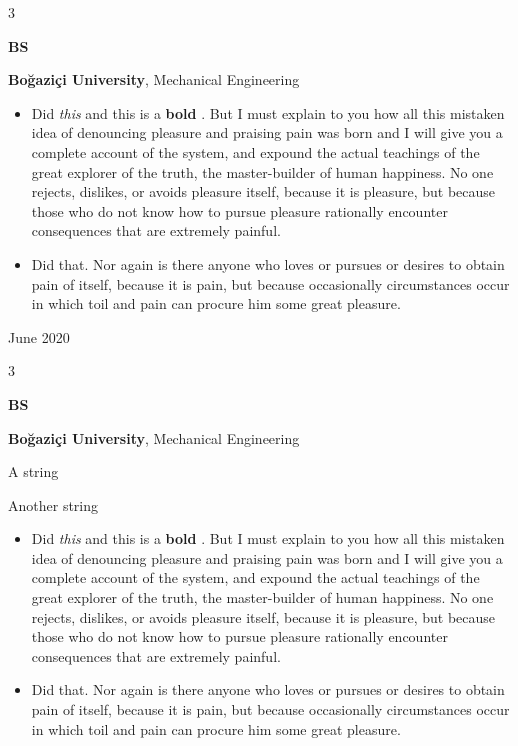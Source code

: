 \documentclass[10pt, letterpaper]{article}
\newenvironment{summary}{
    \begin{description}[
        topsep=0.10 cm,
        parsep=0.10 cm,
        partopsep=0pt,
        itemsep=0pt,
        leftmargin=0.4 cm + 10pt
    ]
}{
    \end{description}
} %
\newenvironment{highlights}{
    \begin{itemize}[
        topsep=0.10 cm,
        parsep=0.10 cm,
        partopsep=0pt,
        itemsep=0pt,
        leftmargin=0.4 cm + 10pt
    ]
}{
    \end{itemize}
} %
\newenvironment{threecolentry}[3][]{
    \onecolentry
    \def\thirdColumn{#3}
    \setcolumnwidth{1 cm, \fill, 4.5 cm}
    \begin{paracol}{3}
    {\raggedright #2} \switchcolumn
}{
    \switchcolumn \raggedleft \thirdColumn
    \end{paracol}
    \endonecolentry
} %
\let\hrefWithoutArrow\href
\renewcommand{\href}[2]{\hrefWithoutArrow{#1}{\ifthenelse{\equal{#2}{}}{ }{#2 }\raisebox{.15ex}{\footnotesize \faExternalLink*}}}
\begin{document}
        \vspace{0.2 cm}

        \begin{threecolentry}{\textbf{BS}}{
            June 2020
        }
            \textbf{Boğaziçi University}, Mechanical Engineering
            \begin{highlights}
                \item Did \textit{this} and this is a \textbf{bold} \href{https://example.com}{link}. But I must explain to you how all this mistaken idea of denouncing pleasure and praising pain was born and I will give you a complete account of the system, and expound the actual teachings of the great explorer of the truth, the master-builder of human happiness. No one rejects, dislikes, or avoids pleasure itself, because it is pleasure, but because those who do not know how to pursue pleasure rationally encounter consequences that are extremely painful.
                \item Did that. Nor again is there anyone who loves or pursues or desires to obtain pain of itself, because it is pain, but because occasionally circumstances occur in which toil and pain can procure him some great pleasure.
            \end{highlights}
        \end{threecolentry}

        \vspace{0.2 cm}

        \begin{threecolentry}{\textbf{BS}}{
            
        }
            \textbf{Boğaziçi University}, Mechanical Engineering
            \begin{summary}
                \item A string
                \item Another string
            \end{summary}
            \begin{highlights}
                \item Did \textit{this} and this is a \textbf{bold} \href{https://example.com}{link}. But I must explain to you how all this mistaken idea of denouncing pleasure and praising pain was born and I will give you a complete account of the system, and expound the actual teachings of the great explorer of the truth, the master-builder of human happiness. No one rejects, dislikes, or avoids pleasure itself, because it is pleasure, but because those who do not know how to pursue pleasure rationally encounter consequences that are extremely painful.
                \item Did that. Nor again is there anyone who loves or pursues or desires to obtain pain of itself, because it is pain, but because occasionally circumstances occur in which toil and pain can procure him some great pleasure.
            \end{highlights}
        \end{threecolentry}
\end{document}
